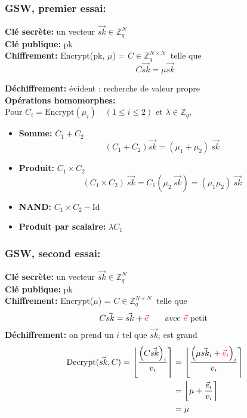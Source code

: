 \documentclass[10pt,xcolor={usenames,dvipsnames}]{beamer}
\newcommand{\ZZq}{\mathbb{Z}_q}
\begin{document}
\begin{frame} 
\frametitle{GSW, premier essai:}
\textbf{Clé secrète:} un vecteur $\vec{sk} \in \ZZq^{N}$ \\
\textbf{Clé publique:} pk\\
\textbf{Chiffrement:} Encrypt(pk, $\mu$) = $C\in \ZZq^{N \times N}\:$ telle que  
\[C \vec{sk} = \mu\vec{sk}\]
\vspace{-1cm}

\textbf{Déchiffrement:} évident : recherche de valeur propre \\
\textbf{Opérations homomorphes:}\\
Pour {\small$C_i = \text{Encrypt}(\mu_i) \quad(1 \leqslant i \leqslant 2)$}
et $\lambda \in \ZZq$,
\begin{itemize}
\item \textbf{Somme:} $C_1 + C_2\quad$
\[\left(C_1 + C_2\right) \vec{sk} = (\mu_1 + \mu_2)\: \vec{sk}\]
\item \textbf{Produit:} $C_1 \times C_2\quad$
\[\left(C_1 \times C_2\right)\: \vec{sk} = C_1\left(\mu_2\:\vec{sk}\right) = (\mu_1 \mu_2)\:\vec{sk}\]
\item \textbf{NAND:} $C_1 \times C_2 - \text{Id}$
\item \textbf{Produit par scalaire:} $\lambda C_1\quad$
\end{itemize}
\end{frame} 


\begin{frame} 
\frametitle{GSW, second essai:}
\textbf{Clé secrète:} un vecteur $\vec{sk} \in \ZZq^{N}$ \\
\textbf{Clé publique:} pk\\
\textbf{Chiffrement:} Encrypt($\mu$) = $C\in \ZZq^{N \times N}\:$ telle que  
\[C \vec{sk} = \vec{sk} + {\color{red}\vec{e}}\qquad \text{avec }  {\color{red}\vec{e}} \text{ petit} \]
\textbf{Déchiffrement:} on prend un $i$ tel que $\vec{sk}_i$ est grand
\begin{align*}
\text{Decrypt}(\vec{sk}, C) = \left\lfloor \frac{{\left(C\vec{sk}\right)}_i}{v_i} \right\rceil &= 
\left\lfloor \frac{{\left(\mu\vec{sk}_i + {\color{red}\vec{e}_i}\right)}_i}{v_i} \right\rceil \\
&= \left\lfloor \mu + \frac{\vec{e}_i}{v_i} \right\rceil \\
&= \mu
\end{align*}
\end{frame} 
\end{document}
